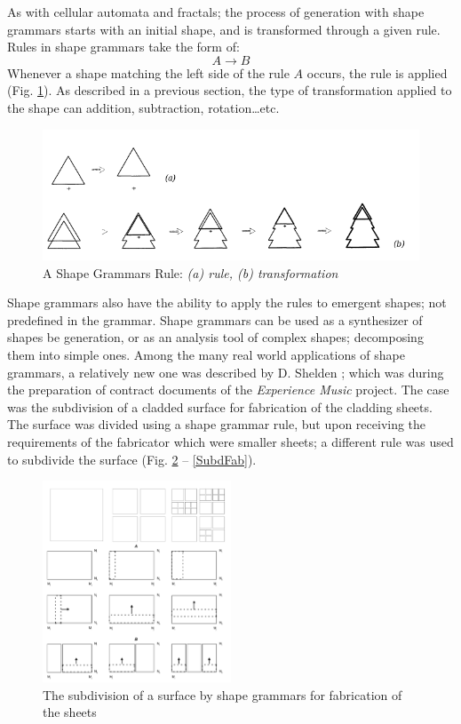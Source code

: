 As with cellular automata and fractals; the process of generation with shape grammars starts with an initial shape, and is transformed through a given rule. Rules in shape grammars take the form of: \begin{equation} A \rightarrow B \end{equation}
Whenever a shape matching the left side of the rule $A$ occurs, the rule is applied (Fig. \ref{ShapeGrammarsRule}). As described in a previous section, the type of transformation applied to the shape can addition, subtraction, rotation\ldots etc. 

\begin{figure}[htbp]
\centering
\includegraphics[width=\textwidth]{./Images/12-ShapeGrammarsRule}
\caption[Shape Grammars Rule]{A Shape Grammars Rule: \emph{(a) rule, (b) transformation} \cite{arida04}}
\label{ShapeGrammarsRule}
\end{figure}

Shape grammars also have the ability to apply the rules to emergent shapes; not predefined in the grammar. Shape grammars can be used as a synthesizer of shapes be generation, or as an analysis tool of complex shapes; decomposing them into simple ones. Among the many real world applications of shape grammars, a relatively new one was described by D. Shelden \cite{shelden02}; which was during the preparation of contract documents of the \emph{Experience Music} project. The case was the subdivision of a cladded surface for fabrication of the cladding sheets. The surface was divided using a shape grammar rule, but upon receiving the requirements of the fabricator which were smaller sheets; a different rule was used to subdivide the surface (Fig. \ref{SubdivisionSG} -- \ref{SubdFab}).

\begin{figure}[htbp]
\centering
\includegraphics[width=0.5\textwidth]{./Images/13-SubdivisionRule}
\caption[Shape Grammar Subdivision]{The subdivision of a surface by shape grammars for fabrication of the sheets \cite{shelden02}}
\label{SubdivisionSG}
\end{figure}

